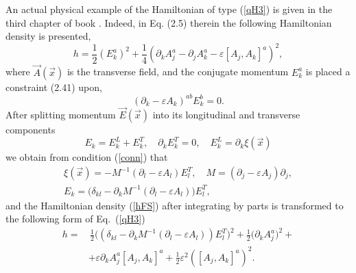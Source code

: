 \documentclass[12pt]{article}
\newcommand{\ve}{\varepsilon}
\begin{document}
	An actual physical example of the Hamiltonian of type
(\ref{qH3})
	is given in the third chapter of book
\cite{FS}.
	Indeed, in Eq.
(2.5)
	therein the following Hamiltonian density is presented,
\begin{equation}
\label{hFS}
    h = \frac{1}{2} (E_{k}^{a})^{2} + \frac{1}{4}
	(\partial_{k}A_{j}^{a} - \partial_{j}A_{k}^{a}
	    - \ve [A_{j},A_{k}]^{a})^{2} ,
\end{equation}
	where
$ \vec{A}(\vec{x}) $ is the transverse field, and
	the conjugate momentum
$ E_{k}^{a} $
	is placed a constraint (2.41) upon,
\begin{equation}
\label{conn}
    (\partial_{k} - \ve A_{k})^{ab} E_{k}^{b} = 0 .
\end{equation}
	After splitting momentum
$ \vec{E}(\vec{x}) $
	into its longitudinal and transverse components
\begin{equation*}
    E_{k} = E_{k}^{L} + E_{k}^{T} ,\quad \partial_{k} E_{k}^{T} = 0,
	\quad E_{k}^{L} = \partial_{k} \xi(\vec{x})
\end{equation*}
	we obtain from condition
(\ref{conn})
	that
\begin{gather*}
    \xi(\vec{x}) = -M^{-1} (\partial_{l} -\ve A_{l}) E_{l}^{T},
    \quad M = (\partial_{j} - \ve A_{j})\partial_{j} , \\
    E_{k} = \bigl(\delta_{kl}
	- \partial_{k} M^{-1} (\partial_{l} -\ve A_{l})\bigr) E_{l}^{T},
\end{gather*}
	and the Hamiltonian density
(\ref{hFS})
	after integrating by parts is transformed to the following
    form of 
Eq.~(\ref{qH3})
\begin{align*}
    h =& \,\frac{1}{2} \bigl( (\delta_{kl}
	- \partial_{k} M^{-1} (\partial_{l} -\ve A_{l}) ) E_{l}^{T} \bigr)^{2}
	+ \frac{1}{2} \bigl( \partial_{k}A_{j}^{a} \bigr)^{2} +\\
	&+ \ve \partial_{k}A_{j}^{a} [A_{j}, A_{k}]^{a}
	+\frac{1}{2} \ve^{2} ([A_{j},A_{k}]^{a})^{2} .
\end{align*}
\end{document}
